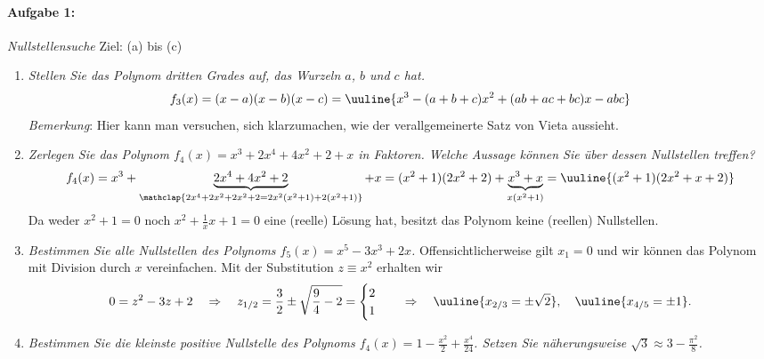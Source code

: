 
\paragraph{Aufgabe 1: } \emph{Nullstellensuche} \hfill Ziel: (a) bis (c)\\[-4mm]
\begin{enumerate}[label=(\alph*), labelindent=1em,labelsep=0.5cm]
    \item \emph{Stellen Sie das Polynom dritten Grades auf, das Wurzeln $a$, $b$ und $c$ hat.}
    \begin{align*}
        f_3(x) = (x-a)(x-b)(x-c) = \uuline{x^3-(a+b+c) x^2 + (ab+ac+bc) x - abc}
    \end{align*}
    \emph{Bemerkung}: Hier kann man versuchen, sich klarzumachen, wie der verallgemeinerte Satz von Vieta aussieht.
    \item \emph{Zerlegen Sie das Polynom $f_4(x)=x^3+2x^4+4x^2+2+x$ in Faktoren. Welche Aussage können Sie über dessen Nullstellen treffen?}
    \begin{align*}
        f_4(x) = x^3 + \underbrace{2x^4 +4x^2 +2}_{\mathclap{2x^4+2x^2+2x^2 +2 = 2x^2(x^2+1) + 2(x^2+1)}} +x = (x^2+1)(2x^2+2) + \underbrace{x^3+x}_{x(x^2+1)} = \uuline{(x^2+1)(2x^2+x+2)}
    \end{align*}
    Da weder $x^2 +1 = 0$ noch $\textstyle x^2 +\frac{1}{x}x+1=0$ eine (reelle) Lösung hat, besitzt das Polynom keine (reellen) Nullstellen.
    \item \emph{Bestimmen Sie alle Nullstellen des Polynoms $f_5(x)=x^5-3x^3+2x$.}
    Offensichtlicherweise gilt $x_1 = 0$ und wir können das Polynom mit Division durch $x$ vereinfachen. Mit der Substitution $z \equiv x^2$ erhalten wir 
    \begin{align*}
        0 = z^2 -3z +2 \quad \Rightarrow \quad z_{1/2} = \frac{3}{2}\pm \sqrt{\frac{9}{4}-2} = \begin{cases}
            2 \\ 1
        \end{cases} \quad \Rightarrow \quad \uuline{x_{2/3} = \pm \sqrt{2}}, \quad \uuline{x_{4/5} = \pm 1}.
    \end{align*}
    \item \emph{Bestimmen Sie die kleinste positive Nullstelle des Polynoms $\textstyle f_4(x)=1-\frac{x^2}{2}+\frac{x^4}{24}$. Setzen Sie näherungsweise $\textstyle \sqrt{3}\approx 3-\frac{\pi^2}{8}$.}

\end{enumerate}
